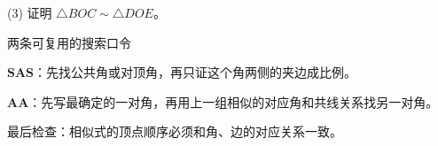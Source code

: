 \documentclass{exam-zh}
\begin{document}
\begin{eduSubQuestionItem}{(3)}
证明 $\triangle BOC\sim\triangle DOE$。\end{eduSubQuestionItem}

\begin{eduDualExplain}
  \begin{eduExplainLeft}
  \end{eduExplainLeft}

  \begin{eduExplainRight}
      
  \end{eduExplainRight}
\end{eduDualExplain}




\begin{eduSummaryBlock}{\eduIconPin}{两条可复用的搜索口令}
\begin{eduBulletList}
  \item $\textbf{SAS：}$先找公共角或对顶角，再只证这个角两侧的夹边成比例。  \item $\textbf{AA：}$先写最确定的一对角，再用上一组相似的对应角和共线关系找另一对角。  \item $\textbf{最后检查：}$相似式的顶点顺序必须和角、边的对应关系一致。\end{eduBulletList}
\end{eduSummaryBlock}
\end{document}
